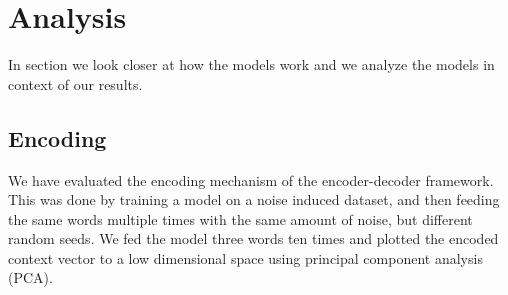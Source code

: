 
\section{Analysis}
\label{sec:reasoning}
In section we look closer at how the models work and we analyze the models in context of our results.

\subsection{Encoding}
We have evaluated the encoding mechanism of the encoder-decoder framework. This was done by training a model on a noise induced dataset, and then feeding the same words multiple times with the same amount of noise, but different random seeds. We fed the model three words ten times and plotted the encoded context vector to a low dimensional space using principal component analysis (PCA). 

